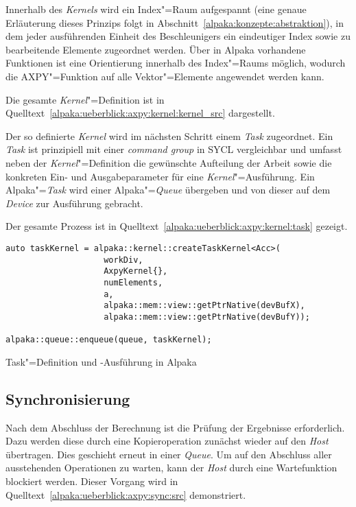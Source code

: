 Innerhalb des \textit{Kernels} wird ein Index"=Raum aufgespannt (eine genaue
Erläuterung dieses Prinzips folgt in
Abschnitt~\ref{alpaka:konzepte:abstraktion}), in dem jeder ausführenden Einheit
des Beschleunigers ein eindeutiger Index sowie zu bearbeitende Elemente
zugeordnet werden. Über in Alpaka vorhandene Funktionen ist eine Orientierung
innerhalb des Index"=Raums möglich, wodurch die AXPY"=Funktion auf alle
Vektor"=Elemente angewendet werden kann.

Die gesamte \textit{Kernel}"=Definition ist in
Quelltext~\ref{alpaka:ueberblick:axpy:kernel:kernel_src} dargestellt.

Der so definierte \textit{Kernel} wird im nächsten Schritt einem \textit{Task}
zugeordnet. Ein \textit{Task} ist prinzipiell mit einer \textit{command group}
in SYCL vergleichbar und umfasst neben der \textit{Kernel}"=Definition die
gewünschte Aufteilung der Arbeit sowie die konkreten Ein- und Ausgabeparameter
für eine \textit{Kernel}"=Ausführung. Ein Alpaka"=\textit{Task} wird einer
Alpaka"=\textit{Queue} übergeben und von dieser auf dem \textit{Device} zur
Ausführung gebracht.

Der gesamte Prozess ist in Quelltext~\ref{alpaka:ueberblick:axpy:kernel:task}
gezeigt.

\begin{code}
    \begin{verbatim}
auto taskKernel = alpaka::kernel::createTaskKernel<Acc>(
                    workDiv,
                    AxpyKernel{},
                    numElements,
                    a,
                    alpaka::mem::view::getPtrNative(devBufX),
                    alpaka::mem::view::getPtrNative(devBufY));

alpaka::queue::enqueue(queue, taskKernel);
    \end{verbatim}
    \caption{Task"=Definition und -Ausführung in Alpaka}
    \label{alpaka:ueberblick:axpy:kernel:task}
\end{code}

\subsection{Synchronisierung}
\label{alpaka:ueberblick:axpy:sync}

Nach dem Abschluss der Berechnung ist die Prüfung der Ergebnisse erforderlich.
Dazu werden diese durch eine Kopieroperation zunächst wieder auf den
\textit{Host} übertragen. Dies geschieht erneut in einer \textit{Queue}. Um
auf den Abschluss aller ausstehenden Operationen zu warten, kann der
\textit{Host} durch eine Wartefunktion blockiert werden. Dieser Vorgang wird in
Quelltext~\ref{alpaka:ueberblick:axpy:sync:src} demonstriert.

